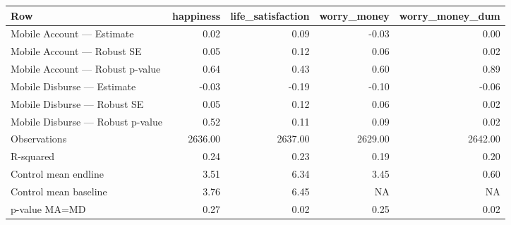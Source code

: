 
\begin{tabular}{lrrrr}
\toprule
Row & happiness & life\_satisfaction & worry\_money & worry\_money\_dum\\
\midrule
Mobile Account — Estimate & 0.02 & 0.09 & -0.03 & 0.00\\
Mobile Account — Robust SE & 0.05 & 0.12 & 0.06 & 0.02\\
Mobile Account — Robust p-value & 0.64 & 0.43 & 0.60 & 0.89\\
Mobile Disburse — Estimate & -0.03 & -0.19 & -0.10 & -0.06\\
Mobile Disburse — Robust SE & 0.05 & 0.12 & 0.06 & 0.02\\
\addlinespace
Mobile Disburse — Robust p-value & 0.52 & 0.11 & 0.09 & 0.02\\
Observations & 2636.00 & 2637.00 & 2629.00 & 2642.00\\
R-squared & 0.24 & 0.23 & 0.19 & 0.20\\
Control mean endline & 3.51 & 6.34 & 3.45 & 0.60\\
Control mean baseline & 3.76 & 6.45 & NA & NA\\
\addlinespace
p-value MA=MD & 0.27 & 0.02 & 0.25 & 0.02\\
\bottomrule
\end{tabular}

